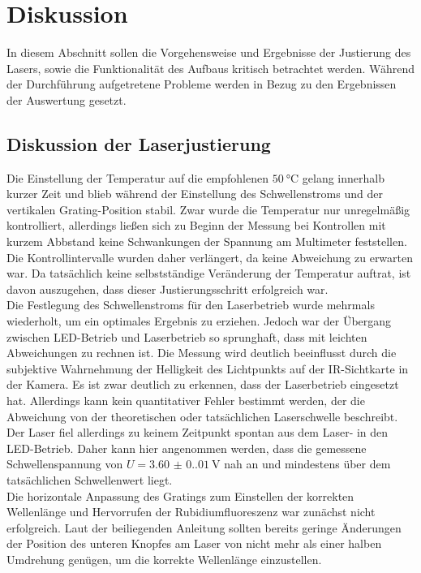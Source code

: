 \section{Diskussion}
\label{sec:Diskussion}
    In diesem Abschnitt sollen die Vorgehensweise und Ergebnisse der Justierung des Lasers, sowie die Funktionalität des Aufbaus kritisch betrachtet werden. 
    Während der Durchführung aufgetretene Probleme werden in Bezug zu den Ergebnissen der Auswertung gesetzt.
    \subsection{Diskussion der Laserjustierung}
        Die Einstellung der Temperatur auf die empfohlenen $\qty{50}{\degreeCelsius}$ gelang innerhalb kurzer Zeit und blieb während der Einstellung des Schwellenstroms und der vertikalen Grating-Position stabil. 
        Zwar wurde die Temperatur nur unregelmäßig kontrolliert, allerdings ließen sich zu Beginn der Messung bei Kontrollen mit kurzem Abbstand keine Schwankungen der Spannung am Multimeter feststellen.
        Die Kontrollintervalle wurden daher verlängert, da keine Abweichung zu erwarten war. Da tatsächlich keine selbstständige Veränderung der Temperatur auftrat, ist davon auszugehen, dass dieser Justierungsschritt erfolgreich war.
        \\
        Die Festlegung des Schwellenstroms für den Laserbetrieb wurde mehrmals wiederholt, um ein optimales Ergebnis zu erziehen.
        Jedoch war der Übergang zwischen LED-Betrieb und Laserbetrieb so sprunghaft, dass mit leichten Abweichungen zu rechnen ist.
        Die Messung wird deutlich beeinflusst durch die subjektive Wahrnehmung der Helligkeit des Lichtpunkts auf der IR-Sichtkarte in der Kamera. 
        Es ist zwar deutlich zu erkennen, dass der Laserbetrieb eingesetzt hat. Allerdings kann kein quantitativer Fehler bestimmt werden, der die Abweichung von der theoretischen oder tatsächlichen Laserschwelle beschreibt.
        Der Laser fiel allerdings zu keinem Zeitpunkt spontan aus dem Laser- in den LED-Betrieb.
        Daher kann hier angenommen werden, dass die gemessene Schwellenspannung von $U = \qty{3.60(0.01)}{\volt}$ nah an und mindestens über dem tatsächlichen Schwellenwert liegt.
        \\
        Die horizontale Anpassung des Gratings zum Einstellen der korrekten Wellenlänge und Hervorrufen der Rubidiumfluoreszenz war zunächst nicht erfolgreich.
        Laut der beiliegenden Anleitung sollten bereits geringe Änderungen der Position des unteren Knopfes am Laser von nicht mehr als einer halben Umdrehung genügen, um die korrekte Wellenlänge einzustellen.
